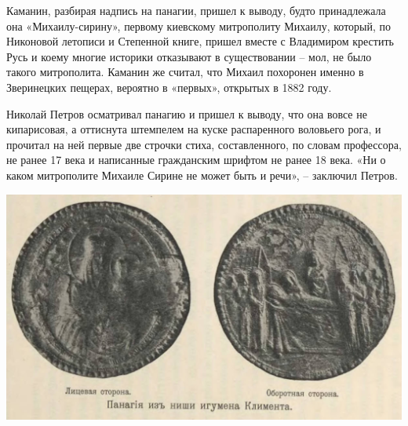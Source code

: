 Каманин, разбирая надпись на панагии, пришел к выводу, будто принадлежала она «Михаилу-сирину», первому киевскому митрополиту Михаилу, который, по Никоновой летописи и Степенной книге, пришел вместе с Владимиром крестить Русь и коему многие историки отказывают в существовании – мол, не было такого митрополита. Каманин же считал, что Михаил похоронен именно в Зверинецких пещерах, вероятно в «первых», открытых в 1882 году.

Николай Петров осматривал панагию и пришел к выводу, что она вовсе не кипарисовая, а оттиснута штемпелем на куске распаренного воловьего рога, и прочитал на ней первые две строчки стиха, составленного, по словам профессора, не ранее 17 века и написанные гражданским шрифтом не ранее 18 века. «Ни о каком митрополите Михаиле Сирине не может быть и речи», – заключил Петров.
\vspace*{\fill}
\begin{center}
\includegraphics[width=\linewidth]{chast-colebanie-osnov/nachalo/panagia.jpg}
\end{center}
\vspace*{\fill}
\newpage

